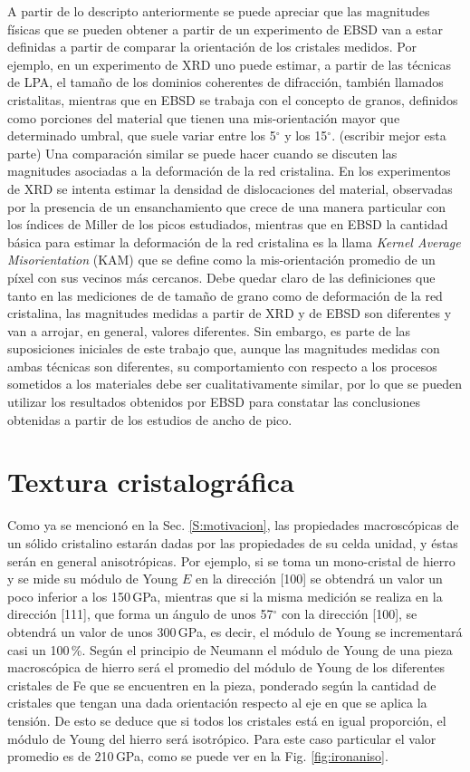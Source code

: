 A partir de lo descripto anteriormente se puede apreciar que las magnitudes físicas que se pueden obtener a partir de un experimento de EBSD van a estar definidas a partir de comparar la orientación de los cristales medidos.
Por ejemplo, en un experimento de XRD uno puede estimar, a partir de las técnicas de LPA, el tamaño de los dominios coherentes de difracción, también llamados cristalitas, mientras que en EBSD se trabaja con el concepto de granos, definidos como porciones del material que tienen una mis-orientación mayor que determinado umbral, que suele variar entre los 5$^{\circ}$ y los 15$^{\circ}$. (escribir mejor esta parte)
Una comparación similar se puede hacer cuando se discuten las magnitudes asociadas a la deformación de la red cristalina. En los experimentos de XRD se intenta estimar la densidad de dislocaciones del material, observadas por la presencia de un ensanchamiento que crece de una manera particular con los índices  de Miller de los picos estudiados, mientras que en EBSD la cantidad básica para estimar la deformación de la red cristalina es la llama \textit{Kernel Average Misorientation} (KAM) que se define como la mis-orientación promedio de un píxel con sus vecinos más cercanos.
Debe quedar claro de las definiciones que tanto en las mediciones de de tamaño de grano como de deformación de la red cristalina, las magnitudes medidas a partir de XRD y de EBSD son diferentes y van a arrojar, en general, valores diferentes.
Sin embargo, es parte de las suposiciones iniciales de este trabajo que, aunque las magnitudes medidas con ambas técnicas son diferentes, su comportamiento con respecto a los procesos sometidos a los materiales debe ser cualitativamente similar, por lo que se pueden utilizar los resultados obtenidos por EBSD para constatar las conclusiones obtenidas a partir de los estudios de ancho de pico.

\section{Textura cristalográfica}\label{S:Text}
Como ya se mencionó en la Sec. \ref{S:motivacion}, las propiedades macroscópicas de un sólido cristalino estarán dadas por las propiedades de su celda unidad, y éstas serán en general anisotrópicas.
Por ejemplo, si se toma un mono-cristal de hierro y se mide su módulo de Young $E$ en la dirección [100] se obtendrá un valor un poco inferior a los 150\,GPa, mientras que si la misma medición se realiza en la dirección [111], que forma un ángulo de unos 57$^{\circ}$ con la dirección [100], se obtendrá un valor de unos 300\,GPa, es decir, el módulo de Young se incrementará casi un 100\,\%.
Según el principio de Neumann\cite{nye1985physical} el módulo de Young de una pieza macroscópica de hierro será el promedio del módulo de Young de los diferentes cristales de Fe que se encuentren en la pieza, ponderado según la cantidad de cristales que tengan una dada orientación respecto al eje en que se aplica la tensión.
De esto se deduce que si todos los cristales está en igual proporción, el módulo de Young del hierro será isotrópico.
Para este caso particular el valor promedio es de 210\,GPa, como se puede ver en la Fig. \ref{fig:ironaniso}.

